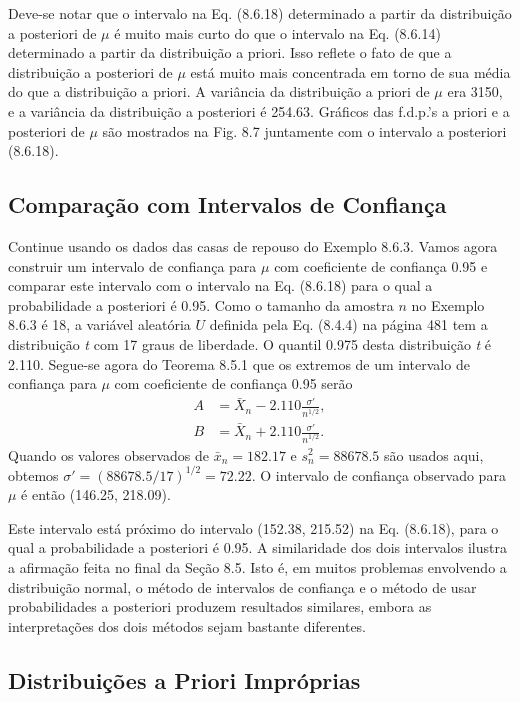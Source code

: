     Deve-se notar que o intervalo na Eq. (8.6.18) determinado a partir da distribuição a posteriori de $\mu$ é muito mais curto do que o intervalo na Eq. (8.6.14) determinado a partir da distribuição a priori. Isso reflete o fato de que a distribuição a posteriori de $\mu$ está muito mais concentrada em torno de sua média do que a distribuição a priori. A variância da distribuição a priori de $\mu$ era 3150, e a variância da distribuição a posteriori é 254.63. Gráficos das f.d.p.'s a priori e a posteriori de $\mu$ são mostrados na Fig. 8.7 juntamente com o intervalo a posteriori (8.6.18).
\vspace{1em}

\subsection*{Comparação com Intervalos de Confiança}

Continue usando os dados das casas de repouso do Exemplo 8.6.3. Vamos agora construir um intervalo de confiança para $\mu$ com coeficiente de confiança 0.95 e comparar este intervalo com o intervalo na Eq. (8.6.18) para o qual a probabilidade a posteriori é 0.95. Como o tamanho da amostra $n$ no Exemplo 8.6.3 é 18, a variável aleatória $U$ definida pela Eq. (8.4.4) na página 481 tem a distribuição \textit{t} com 17 graus de liberdade. O quantil 0.975 desta distribuição \textit{t} é 2.110. Segue-se agora do Teorema 8.5.1 que os extremos de um intervalo de confiança para $\mu$ com coeficiente de confiança 0.95 serão
\begin{align*}
    A &= \bar{X}_n - 2.110 \frac{\sigma'}{n^{1/2}}, \\
    B &= \bar{X}_n + 2.110 \frac{\sigma'}{n^{1/2}}.
\end{align*}
Quando os valores observados de $\bar{x}_n = 182.17$ e $s_n^2 = 88678.5$ são usados aqui, obtemos $\sigma' = (88678.5/17)^{1/2} = 72.22$. O intervalo de confiança observado para $\mu$ é então (146.25, 218.09).

Este intervalo está próximo do intervalo (152.38, 215.52) na Eq. (8.6.18), para o qual a probabilidade a posteriori é 0.95. A similaridade dos dois intervalos ilustra a afirmação feita no final da Seção 8.5. Isto é, em muitos problemas envolvendo a distribuição normal, o método de intervalos de confiança e o método de usar probabilidades a posteriori produzem resultados similares, embora as interpretações dos dois métodos sejam bastante diferentes.

\subsection*{Distribuições a Priori Impróprias}


